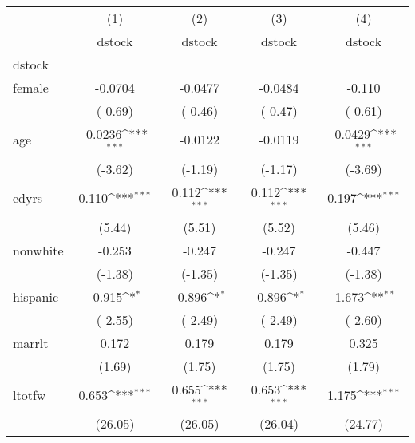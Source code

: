 {
\def\sym#1{\ifmmode^{#1}\else\(^{#1}\)\fi}
\begin{tabular}{l*{4}{c}}
\hline\hline
            &\multicolumn{1}{c}{(1)}&\multicolumn{1}{c}{(2)}&\multicolumn{1}{c}{(3)}&\multicolumn{1}{c}{(4)}\\
            &\multicolumn{1}{c}{dstock}&\multicolumn{1}{c}{dstock}&\multicolumn{1}{c}{dstock}&\multicolumn{1}{c}{dstock}\\
\hline
dstock      &                     &                     &                     &                     \\
female      &     -0.0704         &     -0.0477         &     -0.0484         &      -0.110         \\
            &     (-0.69)         &     (-0.46)         &     (-0.47)         &     (-0.61)         \\
[1em]
age         &     -0.0236\sym{***}&     -0.0122         &     -0.0119         &     -0.0429\sym{***}\\
            &     (-3.62)         &     (-1.19)         &     (-1.17)         &     (-3.69)         \\
[1em]
edyrs       &       0.110\sym{***}&       0.112\sym{***}&       0.112\sym{***}&       0.197\sym{***}\\
            &      (5.44)         &      (5.51)         &      (5.52)         &      (5.46)         \\
[1em]
nonwhite    &      -0.253         &      -0.247         &      -0.247         &      -0.447         \\
            &     (-1.38)         &     (-1.35)         &     (-1.35)         &     (-1.38)         \\
[1em]
hispanic    &      -0.915\sym{*}  &      -0.896\sym{*}  &      -0.896\sym{*}  &      -1.673\sym{**} \\
            &     (-2.55)         &     (-2.49)         &     (-2.49)         &     (-2.60)         \\
[1em]
marrlt      &       0.172         &       0.179         &       0.179         &       0.325         \\
            &      (1.69)         &      (1.75)         &      (1.75)         &      (1.79)         \\
[1em]
ltotfw      &       0.653\sym{***}&       0.655\sym{***}&       0.653\sym{***}&       1.175\sym{***}\\
            &     (26.05)         &     (26.05)         &     (26.04)         &     (24.77)         \\

\end{tabular}}
